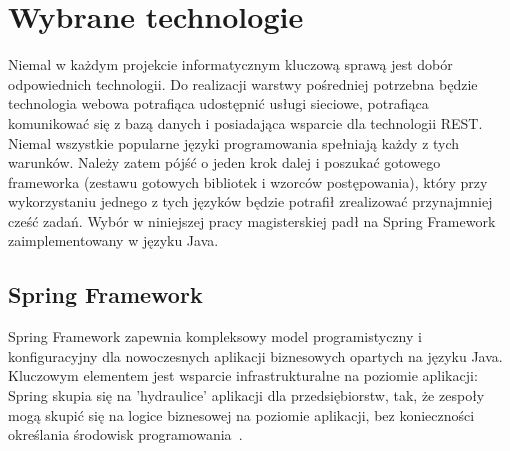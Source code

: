 
\section{Wybrane technologie}
\label{sec:technologies}

Niemal w każdym projekcie informatycznym kluczową sprawą jest dobór odpowiednich technologii. Do realizacji warstwy pośredniej potrzebna będzie technologia webowa potrafiąca udostępnić usługi sieciowe, potrafiąca komunikować się z bazą danych i posiadająca wsparcie dla technologii REST. Niemal wszystkie popularne języki programowania spełniają każdy z tych warunków. Należy zatem pójść o jeden krok dalej i poszukać gotowego frameworka (zestawu gotowych bibliotek i wzorców postępowania), który przy wykorzystaniu jednego z tych języków będzie potrafił zrealizować przynajmniej cześć zadań. Wybór w niniejszej pracy magisterskiej padł na Spring Framework zaimplementowany w języku Java. 

\subsection{Spring Framework  }
Spring Framework zapewnia kompleksowy model programistyczny i konfiguracyjny dla nowoczesnych aplikacji biznesowych opartych na języku Java. Kluczowym elementem jest wsparcie infrastrukturalne  na poziomie aplikacji: Spring skupia się na 'hydraulice' aplikacji dla przedsiębiorstw, tak, że zespoły mogą skupić się na logice biznesowej na poziomie aplikacji, bez konieczności określania środowisk programowania~\cite{springFramework}.

